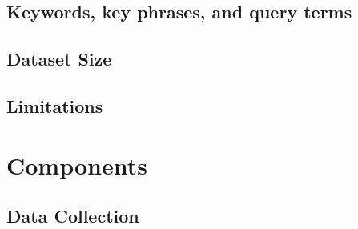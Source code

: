 \documentclass{report}
\begin{document}
\subsection{Keywords, key phrases, and query terms}



\subsection{Dataset Size}


\subsection{Limitations}



\section{Components}

\subsection{Data Collection}


\end{document}
